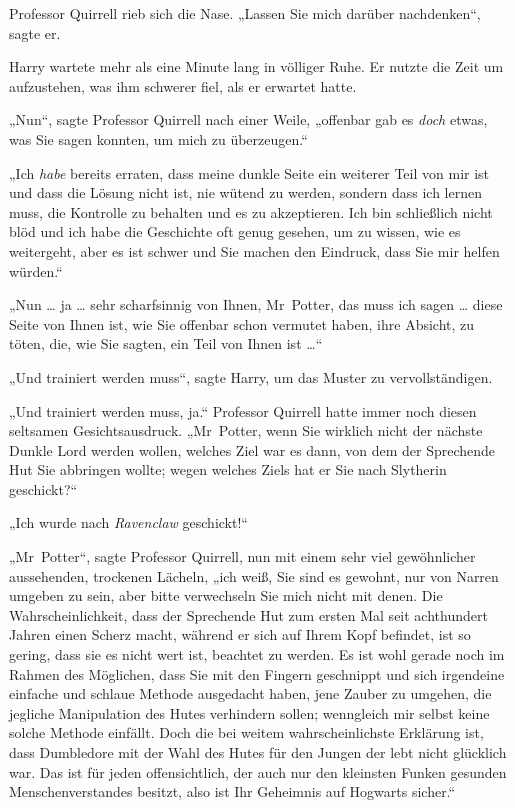 {Professor Quirrell rieb sich die Nase. „Lassen Sie mich darüber nachdenken“, sagte er.

Harry wartete mehr als eine Minute lang in völliger Ruhe. Er nutzte die Zeit um aufzustehen, was ihm schwerer fiel, als er erwartet hatte.

„Nun“, sagte Professor Quirrell nach einer Weile, „offenbar gab es \emph{doch} etwas, was Sie sagen konnten, um mich zu überzeugen.“

„Ich \emph{habe} bereits erraten, dass meine dunkle Seite ein weiterer Teil von mir ist und dass die Lösung nicht ist, nie wütend zu werden, sondern dass ich lernen muss, die Kontrolle zu behalten und es zu akzeptieren. Ich bin schließlich nicht blöd und ich habe die Geschichte oft genug gesehen, um zu wissen, wie es weitergeht, aber es ist schwer und Sie machen den Eindruck, dass Sie mir helfen würden.“

„Nun … ja … sehr scharfsinnig von Ihnen, Mr~Potter, das muss ich sagen … diese Seite von Ihnen ist, wie Sie offenbar schon vermutet haben, ihre Absicht, zu töten, die, wie Sie sagten, ein Teil von Ihnen ist …“

„Und trainiert werden muss“, sagte Harry, um das Muster zu vervollständigen.

„Und trainiert werden muss, ja.“ Professor Quirrell hatte immer noch diesen seltsamen Gesichtsausdruck. „Mr~Potter, wenn Sie wirklich nicht der nächste Dunkle Lord werden wollen, welches Ziel war es dann, von dem der Sprechende Hut Sie abbringen wollte; wegen welches Ziels hat er Sie nach Slytherin geschickt?“

„Ich wurde nach \emph{Ravenclaw} geschickt!“

„Mr~Potter“, sagte Professor Quirrell, nun mit einem sehr viel gewöhnlicher aussehenden, trockenen Lächeln, „ich weiß, Sie sind es gewohnt, nur von Narren umgeben zu sein, aber bitte verwechseln Sie mich nicht mit denen. Die Wahrscheinlichkeit, dass der Sprechende Hut zum ersten Mal seit achthundert Jahren einen Scherz macht, während er sich auf Ihrem Kopf befindet, ist so gering, dass sie es nicht wert ist, beachtet zu werden. Es ist wohl gerade noch im Rahmen des Möglichen, dass Sie mit den Fingern geschnippt und sich irgendeine einfache und schlaue Methode ausgedacht haben, jene Zauber zu umgehen, die jegliche Manipulation des Hutes verhindern sollen; wenngleich mir selbst keine solche Methode einfällt. Doch die bei weitem wahrscheinlichste Erklärung ist, dass Dumbledore mit der Wahl des Hutes für den Jungen der lebt nicht glücklich war. Das ist für jeden offensichtlich, der auch nur den kleinsten Funken gesunden Menschenverstandes besitzt, also ist Ihr Geheimnis auf Hogwarts sicher.“

}
